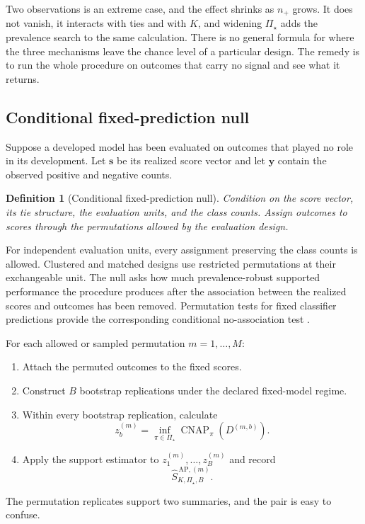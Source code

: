 \documentclass[11pt]{article}
\newcommand{\CNAP}{\operatorname{CNAP}}
\newcommand{\PSet}{\Pi_\star}
\newtheorem{definition}{Definition}
\theoremstyle{remark}
\begin{document}
Two observations is an extreme case, and the effect shrinks as $n_+$ grows. It does not vanish, it interacts with ties and with $K$, and widening $\PSet$ adds the prevalence search to the same calculation. There is no general formula for where the three mechanisms leave the chance level of a particular design. The remedy is to run the whole procedure on outcomes that carry no signal and see what it returns.

\subsection{Conditional fixed-prediction null}

Suppose a developed model has been evaluated on outcomes that played no role in its development. Let $\mathbf{s}$ be its realized score vector and let $\mathbf{y}$ contain the observed positive and negative counts.

\begin{definition}[Conditional fixed-prediction null]
Condition on the score vector, its tie structure, the evaluation units, and the class counts. Assign outcomes to scores through the permutations allowed by the evaluation design.
\end{definition}

For independent evaluation units, every assignment preserving the class counts is allowed. Clustered and matched designs use restricted permutations at their exchangeable unit. The null asks how much prevalence-robust supported performance the procedure produces after the association between the realized scores and outcomes has been removed. Permutation tests for fixed classifier predictions provide the corresponding conditional no-association test \cite{ojala2010permutation}.

For each allowed or sampled permutation $m=1,\ldots,M$:
\begin{enumerate}
\item Attach the permuted outcomes to the fixed scores.
\item Construct $B$ bootstrap replications under the declared fixed-model regime.
\item Within every bootstrap replication, calculate
\[
z_b^{(m)}
=
\inf_{\pi\in\PSet}
\CNAP_\pi(D^{(m,b)}).
\]
\item Apply the support estimator to $z_1^{(m)},\ldots,z_B^{(m)}$ and record
\[
\widehat S_{K,\PSet,B}^{\,\mathrm{AP},(m)}.
\]
\end{enumerate}

The permutation replicates support two summaries, and the pair is easy to confuse.
\end{document}
